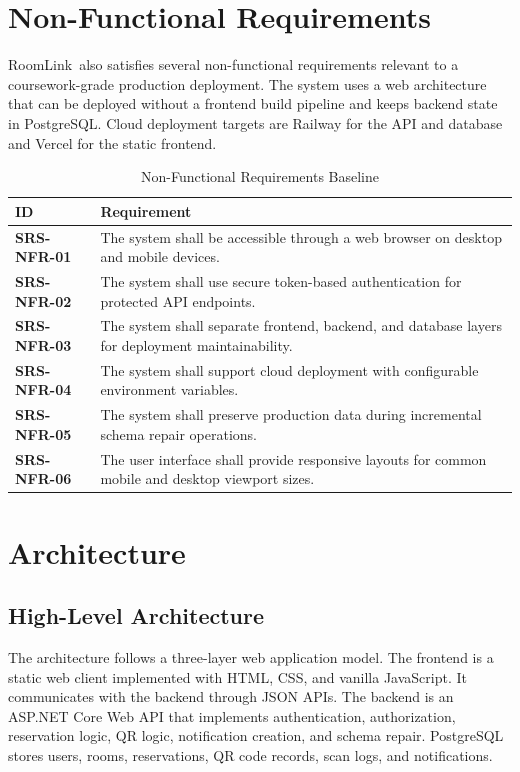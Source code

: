 \documentclass[conference]{IEEEtran}
\newcommand{\srs}[1]{\textbf{#1}}
\newcommand{\RoomLink}{RoomLink}
\begin{document}
\section{Non-Functional Requirements}
\RoomLink\ also satisfies several non-functional requirements relevant to a
coursework-grade production deployment. The system uses a web architecture that
can be deployed without a frontend build pipeline and keeps backend state in
PostgreSQL. Cloud deployment targets are Railway for the API and database and
Vercel for the static frontend.

\begin{table}[htbp]
\caption{Non-Functional Requirements Baseline}
\label{tab:nfr}
\centering
\begin{tabularx}{\linewidth}{@{}lX@{}}
\toprule
\textbf{ID} & \textbf{Requirement} \\
\midrule
\srs{SRS-NFR-01} & The system shall be accessible through a web browser on
desktop and mobile devices. \\
\srs{SRS-NFR-02} & The system shall use secure token-based authentication for
protected API endpoints. \\
\srs{SRS-NFR-03} & The system shall separate frontend, backend, and database
layers for deployment maintainability. \\
\srs{SRS-NFR-04} & The system shall support cloud deployment with configurable
environment variables. \\
\srs{SRS-NFR-05} & The system shall preserve production data during incremental
schema repair operations. \\
\srs{SRS-NFR-06} & The user interface shall provide responsive layouts for
common mobile and desktop viewport sizes. \\
\bottomrule
\end{tabularx}
\end{table}

\section{Architecture}
\subsection{High-Level Architecture}
The architecture follows a three-layer web application model. The frontend is
a static web client implemented with HTML, CSS, and vanilla JavaScript. It
communicates with the backend through JSON APIs. The backend is an ASP.NET
Core Web API that implements authentication, authorization, reservation logic,
QR logic, notification creation, and schema repair. PostgreSQL stores users,
rooms, reservations, QR code records, scan logs, and notifications.
\end{document}
